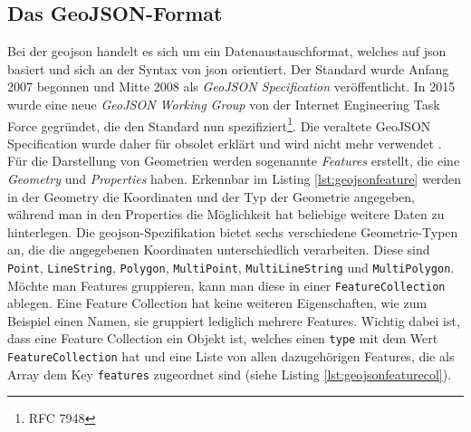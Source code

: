\subsection{Das GeoJSON-Format}
Bei der \ac{geojson} handelt es sich um ein Datenaustauschformat, welches auf \ac{json} basiert und sich an der Syntax von \ac{json} orientiert.
Der Standard wurde Anfang 2007 begonnen und Mitte 2008 als \emph{GeoJSON Specification} veröffentlicht.
In 2015 wurde eine neue \emph{GeoJSON Working Group} von der Internet Engineering Task Force gegründet, die den Standard nun spezifiziert\footnote{RFC 7948}.
Die veraltete GeoJSON Specification wurde daher für obsolet erklärt und wird nicht mehr verwendet \parencite{BUT2008}.\pbreak%
%
Für die Darstellung von Geometrien werden sogenannte \textit{Features} erstellt, die eine \textit{Geometry} und \textit{Properties} haben.
Erkennbar im Listing \ref{lst:geojsonfeature} werden in der Geometry die Koordinaten und der Typ der Geometrie angegeben, während man in den Properties die Möglichkeit hat beliebige weitere Daten zu hinterlegen.
Die \ac{geojson}-Spezifikation bietet sechs verschiedene Geometrie-Typen an, die die angegebenen Koordinaten unterschiedlich verarbeiten.
Diese sind \texttt{Point}, \texttt{LineString}, \texttt{Polygon}, \texttt{MultiPoint}, \texttt{MultiLineString} und \texttt{MultiPolygon}.
\pbreak
Möchte man Features gruppieren, kann man diese in einer \texttt{FeatureCollection} ablegen.
Eine Feature Collection hat keine weiteren Eigenschaften, wie zum Beispiel einen Namen, sie gruppiert lediglich mehrere Features.
Wichtig dabei ist, dass eine Feature Collection ein Objekt ist, welches einen \texttt{type} mit dem Wert \texttt{FeatureCollection} hat und eine Liste von allen dazugehörigen Features, die als Array dem Key \texttt{features} zugeordnet sind (siehe Listing \ref{lst:geojsonfeaturecol}).

